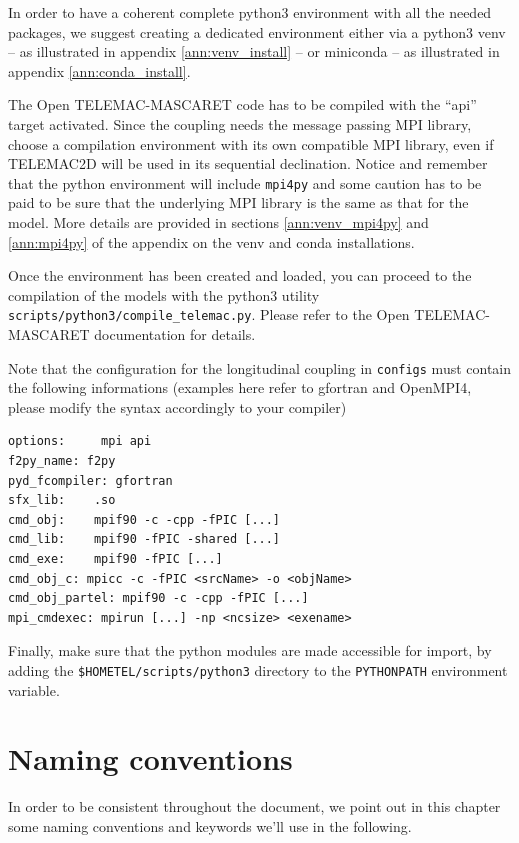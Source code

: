 \documentclass[Coupling]{../../data/TelemacDoc} %
\begin{document}
In order to have a coherent complete python3 environment with all
the needed packages, we suggest creating a
dedicated environment either via a python3 venv -- as illustrated in
appendix \ref{ann:venv_install} -- or miniconda -- as illustrated in
appendix \ref{ann:conda_install}. 
\newline

The Open TELEMAC-MASCARET code has to be compiled with the ``api''
target activated. Since the coupling needs the message passing MPI
library, choose a compilation environment with its own compatible MPI
library, even if TELEMAC2D will be used in its sequential
declination. Notice and remember that the python environment will
include \texttt{mpi4py} and some caution has to be paid to be sure
that the underlying MPI library is the same as that for the model. More
details are provided in sections
\ref{ann:venv_mpi4py} and \ref{ann:mpi4py} of the
appendix on the venv and conda installations.
\newline

Once the environment has been created and loaded, you can
proceed to the compilation of the models with the python3 utility
\texttt{scripts/python3/compile\_telemac.py}. Please refer to the Open
TELEMAC-MASCARET documentation for details.

Note that the configuration for the
longitudinal coupling in \texttt{configs} must contain the following
informations (examples here refer to gfortran and OpenMPI4, please
modify the syntax 
accordingly to your compiler)
\begin{verbatim}
options:     mpi api
f2py_name: f2py
pyd_fcompiler: gfortran
sfx_lib:    .so
cmd_obj:    mpif90 -c -cpp -fPIC [...]
cmd_lib:    mpif90 -fPIC -shared [...]
cmd_exe:    mpif90 -fPIC [...]
cmd_obj_c: mpicc -c -fPIC <srcName> -o <objName>
cmd_obj_partel: mpif90 -c -cpp -fPIC [...]
mpi_cmdexec: mpirun [...] -np <ncsize> <exename>
\end{verbatim}

Finally, make sure that the python modules are made accessible for
import, by adding the \texttt{\$HOMETEL/scripts/python3} directory to
the \texttt{PYTHONPATH} environment variable. 

\chapter{Naming conventions}\label{namcon}
In order to be consistent throughout the document, we point out
in this chapter some naming conventions and keywords we'll use in
the following.
\end{document}
